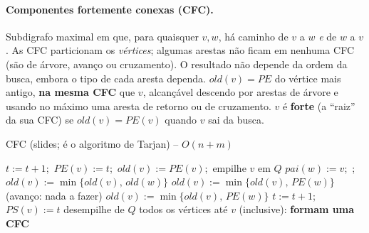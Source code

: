 \paragraph{Componentes fortemente conexas (CFC).} Subdigrafo maximal em que, para quaisquer $v,w$, há caminho de $v$ a $w$ \emph{e} de $w$ a $v$. As CFC particionam os \emph{vértices}; algumas arestas não ficam em nenhuma CFC (são de árvore, avanço ou cruzamento). O resultado não depende da ordem da busca, embora o tipo de cada aresta dependa.
$old(v)=PE$ do vértice mais antigo, \textbf{na mesma CFC} que $v$, alcançável descendo por arestas de árvore e usando no máximo uma aresta de retorno ou de cruzamento. $v$ é \textbf{forte} (a ``raiz'' da sua CFC) se $old(v)=PE(v)$ quando $v$ sai da busca.
\begin{pseudo}{CFC (slides; é o algoritmo de Tarjan) -- $O(n+m)$}
\begin{algorithmic}
  \State $t:=t+1$;\ $PE(v):=t$;\ $old(v):=PE(v)$;\ empilhe $v$ em $Q$
     \State $pai(w):=v$;\ ;\ $old(v):=\min\{old(v),\,old(w)\}$ 
     \State $old(v):=\min\{old(v),\,PE(w)\}$ 
     \State (avanço: nada a fazer)
     \State $old(v):=\min\{old(v),\,PE(w)\}$ 
    \EndIf
  \EndFor
  \State $t:=t+1$;\ $PS(v):=t$
   \State desempilhe de $Q$ todos os vértices até $v$ (inclusive): \textbf{formam uma CFC} \EndIf
\EndProcedure
\end{algorithmic}
\end{pseudo}

